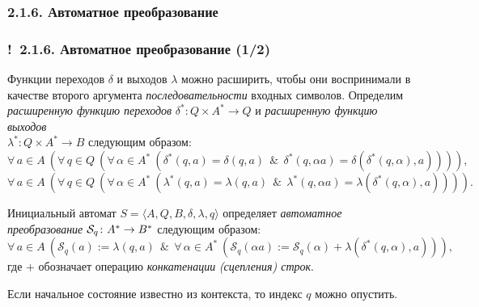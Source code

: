 \documentclass[mathserif,12pt,aspectratio=169]{beamer}
\renewcommand{\index}[1]{}
\def\odmkey#1#2{{\it\color{red} #1}\index{#2}}
\def\A#1#2{\forall\,#1\ \left(#2\right)}
\def\And{\operatorname{\,\&\,}}
\def\Map#1#2#3{{#1}\colon{#2}\nolinebreak\to\nolinebreak{#3}}
\def\Ok{{\color{green}\textbf{!}\ }}
\begin{document}
\subsubsection{2.1.6. Автоматное преобразование}
\begin{frame}
\frametitle{\Ok 2.1.6. Автоматное преобразование (1/2)}

Функции переходов $\delta$ и выходов $\lambda$ можно расширить,
чтобы они воспринимали в качестве второго аргумента {\it
последовательности} входных символов. Определим
\odmkey{расширенную функцию
переходов}{Функция!переходов!расширенная} $\delta^*\colon Q\times
A^* \rightarrow Q$ и \odmkey{расширенную функцию
выходов}{Функция!выходов!расширенная} \\$\lambda^*\colon Q\times A^*
\rightarrow B$  следующим образом:
$$
\A{a\in A}{\A{q\in Q}{\A{\alpha\in
A^*}{\delta^*(q,a)=\delta(q,a)\And\delta^*(q,\alpha a)=
\delta(\delta^*(q,\alpha),a)}}},
$$
$$
\A{a\in A}{\A{q\in Q}{\A{\alpha\in
A^*}{\lambda^*(q,a)=\lambda(q,a)\And\lambda^*(q,\alpha a)=
\lambda(\delta^*(q,\alpha),a)}}}.
$$

Инициальный автомат $S=\langle A, Q, B, \delta, \lambda, q\rangle$
определяет \odmkey{автоматное
преобразование}{Преобразование!автоматное}
$\Map{\mathcal{S}_q}{A^*}{B^*}$ следующим образом:
$$
\A{a \in A}{\mathcal{S}_q(a):= \lambda(q,a)\And \A{\alpha \in
A^*}{\mathcal{S}_q (\alpha a) := \mathcal{S}_q (\alpha) + \lambda
(\delta^*(q,\alpha),a)}},
$$
где $+$ обозначает операцию
\odmkey{конкатенации}{Операция!конкатенации} \odmkey{(сцепления)
строк}{Операция!сцепления}.

\begin{remark}
Если начальное состояние известно
из контекста, то индекс $q$ можно опустить.
\end{remark}

\end{frame}
\end{document}
